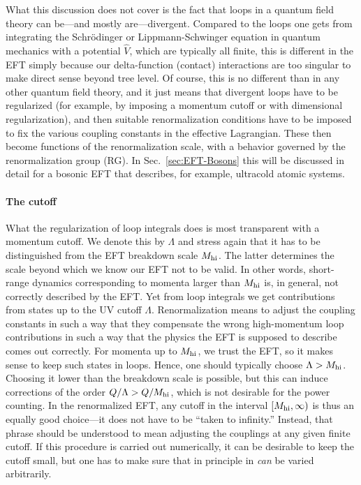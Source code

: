 What this discussion does not cover is the fact that loops in a quantum field 
theory can be---and mostly are---divergent.  Compared to the loops one gets 
from integrating the Schr\"odinger or Lippmann-Schwinger equation in quantum 
mechanics with a potential $\hat{V}$, which are typically all finite, this is 
different in the EFT simply because our delta-function (contact) interactions 
are too singular to make direct sense beyond tree level.  Of course, this is no 
different than in any other quantum field theory, and it just means that 
divergent loops have to be regularized (for example, by imposing a momentum 
cutoff or with dimensional regularization), and then suitable renormalization 
conditions have to be imposed to fix the various coupling constants in the 
effective Lagrangian.  These then become functions of the renormalization scale, 
with a behavior governed by the renormalization group (RG).  In 
Sec.~\ref{sec:EFT-Bosons} this will be discussed in detail for a bosonic EFT 
that describes, for example, ultracold atomic systems.

\paragraph{The cutoff}

What the regularization of loop integrals does is most transparent with a 
momentum cutoff.  We denote this by $\Lambda$ and stress again that it has to 
be distinguished from the EFT breakdown scale $M_{\rm hi}$.  The latter determines 
the scale beyond which we know our EFT not to be valid.  In other words, 
short-range dynamics corresponding to momenta larger than $M_{\rm hi}$ is, in 
general, not correctly described by the EFT.  Yet from loop integrals we get 
contributions from states up to the UV cutoff $\Lambda$.  Renormalization means 
to adjust the coupling constants in such a way that they compensate the wrong 
high-momentum loop contributions in such a way that the physics the EFT is 
supposed to describe comes out correctly.  For momenta up to $M_{\rm hi}$, we 
trust the EFT, so it makes sense to keep such states in loops.  Hence, one 
should typically choose $\Lambda > M_{\rm hi}$.  Choosing it lower than the 
breakdown scale is possible, but this can induce corrections of the order 
$Q/\Lambda > Q/M_{\rm hi}$, which is not desirable for the power counting.  In the 
renormalized EFT, any cutoff in the interval $[M_{\rm hi},\infty)$ is thus an 
equally good choice---it does not have to be ``taken to infinity.''  Instead, 
that phrase should be understood to mean adjusting the couplings at any given 
finite cutoff.  If this procedure is carried out numerically, it can be 
desirable to keep the cutoff small, but one has to make sure that in principle 
in \emph{can} be varied arbitrarily.

